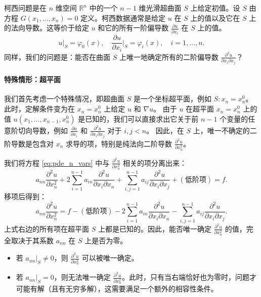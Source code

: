 \documentclass[12pt,a4paper]{article}
\newcommand{\R}{\mathbb{R}}
\numberwithin{subsection}{section}   %
\numberwithin{subsubsection}{subsection}
\theoremstyle{plain}
\theoremstyle{definition}
\theoremstyle{remark}
\theoremstyle{remark}
\begin{document}
	柯西问题是在 \(n\) 维空间 \(\R^n\) 中的一个 \(n-1\) 维光滑超曲面 \(S\) 上给定初值。设 \(S\) 由方程 \(G(x_1, \dots, x_n) = 0\) 定义。柯西数据通常是给定 \(u\) 在 \(S\) 上的值以及它在 \(S\) 上的法向导数。这等价于给定 \(u\) 和它的所有一阶偏导数 \(\frac{\partial u}{\partial x_i}\) 在 \(S\) 上的值。
	\begin{equation}\label{eq:cauchy_n_vars}
		u|_{S} = \varphi_0(x), \quad \frac{\partial u}{\partial x_i}\bigg|_{S} = \varphi_i(x), \quad i=1, \dots, n.
	\end{equation}
	同样，我们的问题是：能否在曲面 \(S\) 上唯一地确定所有的二阶偏导数 \(\frac{\partial^2 u}{\partial x_i \partial x_j}\)？
	
	\paragraph{特殊情形：超平面}
	我们首先考虑一个特殊情况，即超曲面 \(S\) 是一个坐标超平面，例如 \(S: x_n = x_n^0\)。此时，定解条件变为在 \(x_n=x_n^0\) 上给定 \(u\) 和 \(\nabla u\)。
	由于 \(u\) 在超平面 \(x_n=x_n^0\) 上的值 \(u(x_1, \dots, x_{n-1}, x_n^0)\) 是已知的，我们可以直接求出它关于前 \(n-1\) 个变量的任意阶切向导数，例如 \(\frac{\partial u}{\partial x_i}\) 和 \(\frac{\partial^2 u}{\partial x_i \partial x_j}\) 对于 \(i,j < n\)。
	因此，在 \(S\) 上，唯一不确定的二阶导数是包含对 \(x_n\) 求导的项，特别是纯法向二阶导数 \(\frac{\partial^2 u}{\partial x_n^2}\)。
	
	我们将方程 \eqref{eq:pde_n_vars} 中与 \(\frac{\partial^2 u}{\partial x_n^2}\) 相关的项分离出来：
	\[
	a_{nn} \frac{\partial^2 u}{\partial x_n^2} + 2\sum_{i=1}^{n-1} a_{in} \frac{\partial^2 u}{\partial x_i \partial x_n} + \sum_{i,j=1}^{n-1} a_{ij} \frac{\partial^2 u}{\partial x_i \partial x_j} + (\text{低阶项}) = f.
	\]
	移项后得到：
	\[
	a_{nn} \frac{\partial^2 u}{\partial x_n^2} = f - (\text{低阶项}) - 2\sum_{i=1}^{n-1} a_{in} \frac{\partial^2 u}{\partial x_i \partial x_n} - \sum_{i,j=1}^{n-1} a_{ij} \frac{\partial^2 u}{\partial x_i \partial x_j}.
	\]
	上式右边的所有项在超平面 \(S\) 上都是已知的。因此，能否唯一确定 \(\frac{\partial^2 u}{\partial x_n^2}\) 的值，完全取决于其系数 \(a_{nn}\) 在 \(S\) 上是否为零。
	\begin{itemize}
		\item 若 \(a_{nn}|_S \neq 0\)，则 \(\frac{\partial^2 u}{\partial x_n^2}\) 可以被唯一确定。
		\item 若 \(a_{nn}|_S = 0\)，则无法唯一确定 \(\frac{\partial^2 u}{\partial x_n^2}\)。此时，只有当右端恰好也为零时，问题才可能有解（且有无穷多解），这需要满足一个额外的相容性条件。
	\end{itemize}
	
\end{document}
